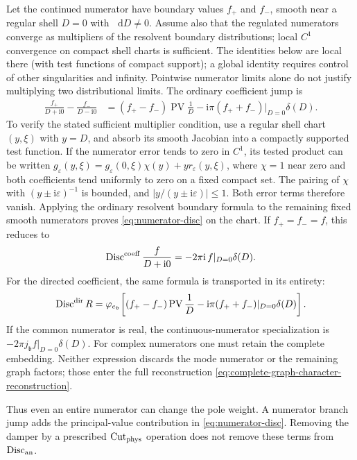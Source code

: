\documentclass[final,5p,times,twocolumn,numbers,nopreprintline]{elsarticle}
\numberwithin{equation}{section}
\theoremstyle{definition}
\theoremstyle{remark}
\newcommand{\dd}{\mathop{}\!\mathrm d}
\newcommand{\ii}{\mathrm i}
\newcommand{\bb}{\mathfrak b}
\newcommand{\PV}{\operatorname{PV}}
\newcommand{\Disc}{\operatorname{Disc}}
\newcommand{\Cut}{\operatorname{Cut}}
\newcommand{\ee}{e_{\bb}}
\newcommand{\je}{j_{\bb}}
\newcommand{\embed}{\varphi_{\ee}}
\begin{document}
Let the continued numerator have boundary values \(f_+\) and
\(f_-\), smooth near a regular shell \(D=0\) with \(\dd D\ne0\).
Assume also that the regulated numerators converge as multipliers of
the resolvent boundary distributions; local \(C^1\) convergence on
compact shell charts is sufficient. The identities below are local
there (with test functions of compact support); a global identity
requires control of other singularities and infinity. Pointwise
numerator limits alone do not justify multiplying two distributional
limits. The ordinary
coefficient jump is
\begin{align}
 \frac{f_+}{D+\ii0}-\frac{f_-}{D-\ii0}
  &=(f_+-f_-)\PV\frac1D
     -\ii\pi(f_++f_-)\big|_{D=0}\delta(D).
 \label{eq:numerator-disc}
\end{align}
To verify the stated sufficient multiplier condition, use a regular
shell chart \((y,\xi)\) with \(y=D\), and absorb its smooth
Jacobian into a compactly supported test function. If the numerator
error tends to zero in \(C^1\), its tested product can be written
\(g_\varepsilon(y,\xi)=g_\varepsilon(0,\xi)\chi(y)
+y r_\varepsilon(y,\xi)\), where \(\chi=1\) near zero and
both coefficients tend uniformly to zero on a fixed compact set.
The pairing of \(\chi\) with \((y\pm\ii\varepsilon)^{-1}\)
is bounded, and \(|y/(y\pm\ii\varepsilon)|\leq1\).
Both error terms therefore vanish. Applying the ordinary resolvent
boundary formula to the remaining fixed smooth numerators proves
\eqref{eq:numerator-disc} on the chart.
If \(f_+=f_-=f\), this reduces to
\begin{equation}
 \Disc^{\rm coeff}\frac{f}{D+\ii0}
       =-2\pi\ii\,f|_{D=0}\delta(D).
 \label{eq:weighted-pole-disc}
\end{equation}
For the directed coefficient, the same formula is transported in
its entirety:
\begin{equation}
 \Disc^{\rm dir}R
 =\embed\!\left[
 (f_+-f_-)\PV\frac1D
   -\ii\pi(f_++f_-)|_{D=0}\delta(D)\right].
 \label{eq:directed-numerator-discontinuity}
\end{equation}
If the common numerator is real, the continuous-numerator
specialization is
\(-2\pi\je f|_{D=0}\delta(D)\).
For complex numerators one must retain the complete embedding.
Neither expression discards the mode numerator or the remaining
graph factors; those enter the full reconstruction
\eqref{eq:complete-graph-character-reconstruction}.

Thus even an entire numerator can change the pole weight.
A numerator branch jump adds the principal-value contribution in
\eqref{eq:numerator-disc}. Removing the damper by a prescribed
\(\Cut_{\rm phys}\) operation does not remove these terms from
\(\Disc_{\rm an}\).
\end{document}
